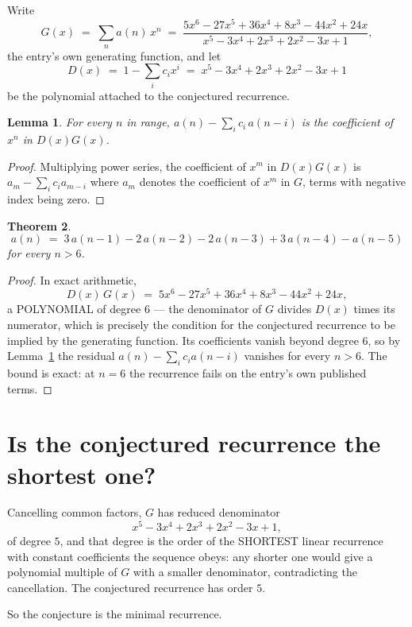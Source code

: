 \documentclass[11pt,a4paper]{article}
\theoremstyle{plain}
\newtheorem{theorem}{Theorem}
\newtheorem{lemma}[theorem]{Lemma}
\theoremstyle{definition}
\begin{document}
Write
\[
G(x)\;=\;\sum_{n}a(n)\,x^{n}\;=\;\frac{5 x^{6} - 27 x^{5} + 36 x^{4} + 8 x^{3} - 44 x^{2} + 24 x}{x^{5} - 3 x^{4} + 2 x^{3} + 2 x^{2} - 3 x + 1},
\]
the entry's own generating function, and let
\[
D(x)\;=\;1-\sum_i c_i x^{i}\;=\;x^{5} - 3 x^{4} + 2 x^{3} + 2 x^{2} - 3 x + 1
\]
be the polynomial attached to the conjectured recurrence.

\begin{lemma}\label{lem:key}
For every $n$ in range, $a(n)-\sum_i c_i\,a(n-i)$ is the coefficient of $x^{n}$ in
$D(x)G(x)$.
\end{lemma}

\begin{proof}
Multiplying power series, the coefficient of $x^{m}$ in $D(x)G(x)$ is
$a_m-\sum_i c_i a_{m-i}$ where $a_m$ denotes the coefficient of $x^{m}$ in $G$, terms with
negative index being zero.
\end{proof}

\begin{theorem}
\[
a(n)\;=\;3\,a(n-1) - 2\,a(n-2) - 2\,a(n-3) + 3\,a(n-4) - a(n-5)
\]
for every $n>6$.
\end{theorem}

\begin{proof}
In exact arithmetic,
\[
D(x)\,G(x)\;=\;5 x^{6} - 27 x^{5} + 36 x^{4} + 8 x^{3} - 44 x^{2} + 24 x,
\]
a POLYNOMIAL of degree $6$ --- the denominator of $G$ divides $D(x)$ times its numerator,
which is precisely the condition for the conjectured recurrence to be implied by the
generating function. Its coefficients vanish beyond degree $6$, so by
Lemma~\ref{lem:key} the residual $a(n)-\sum_ic_ia(n-i)$ vanishes for every
$n>6$. The bound is exact: at $n=6$ the recurrence fails on the entry's own published terms.
\end{proof}

\section{Is the conjectured recurrence the shortest one?}

Cancelling common factors, $G$ has reduced denominator
\[
x^{5} - 3 x^{4} + 2 x^{3} + 2 x^{2} - 3 x + 1,
\]
of degree $5$, and that degree is the order of the SHORTEST linear recurrence with
constant coefficients the sequence obeys: any shorter one would give a polynomial multiple of
$G$ with a smaller denominator, contradicting the cancellation. The conjectured recurrence has
order $5$.

So the conjecture is the minimal recurrence.
\end{document}
